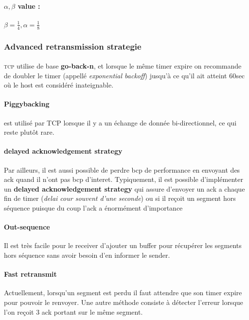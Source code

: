 \paragraph{$\alpha, \beta$ value : }  $\beta = \frac{1}{4}, \alpha = \frac{1}{8}$

\subsubsection{Advanced retransmission strategie}

\paragraph{}
\textsc{tcp} utilise de base \textbf{go-back-n}, et lorsque le même timer
expire on recommande de doubler le timer (appellé \textit{exponential backoff}) jusqu'à
ce qu'il ait atteint 60sec où le host est considéré inateignable.

\paragraph{Piggybacking} est utilisé par TCP lorsque il y a un échange de 
donnée bi-directionnel, ce qui reste plutôt rare.

\paragraph{delayed acknowledgement strategy}
Par ailleurs, il est aussi possible de perdre bcp de performance en envoyant des
ack quand il n'ont pas bcp d'interet. Typiquement, il est possible d'implémenter
un \textbf{delayed acknowledgement strategy} qui assure d'envoyer un ack a chaque fin
de timer (\textit{delai cour souvent d'une seconde}) ou si il reçoit un segment hors séquence puisque du coup
l'ack a énormément d'importance

\paragraph{Out-sequence}
Il est très facile pour le receiver d'ajouter un buffer pour récupérer les
segments hors séquence sans avoir besoin d'en informer le sender.

\paragraph{Fast retransmit}
Actuellement, lorsqu'un segment est perdu il faut attendre que son timer expire
pour pouvoir le renvoyer. Une autre méthode consiste à détecter l'erreur lorsque
l'on reçoit 3 ack portant sur le même segment.

